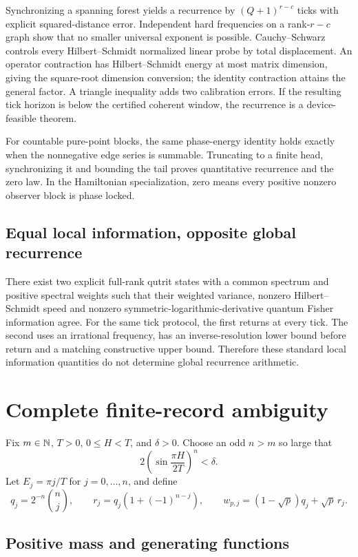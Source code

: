 Synchronizing a spanning forest yields a recurrence by
$(Q+1)^{r-c}$ ticks with explicit squared-distance error.  Independent hard
frequencies on a rank-$r-c$ graph show that no smaller universal exponent is
possible.  Cauchy--Schwarz controls every Hilbert--Schmidt normalized linear
probe by total displacement.  An operator contraction has Hilbert--Schmidt
energy at most matrix dimension, giving the square-root dimension conversion;
the identity contraction attains the general factor.  A triangle inequality
adds two calibration errors.  If the resulting tick horizon is below the
certified coherent window, the recurrence is a device-feasible theorem.

For countable pure-point blocks, the same phase-energy identity holds exactly
when the nonnegative edge series is summable.  Truncating to a finite head,
synchronizing it and bounding the tail proves quantitative recurrence and the
zero law.  In the Hamiltonian specialization, zero means every positive
nonzero observer block is phase locked.

\subsection{Equal local information, opposite global recurrence}

There exist two explicit full-rank qutrit states with a common spectrum and
positive spectral weights such that their weighted variance, nonzero
Hilbert--Schmidt speed and nonzero symmetric-logarithmic-derivative quantum
Fisher information agree.  For the same tick protocol, the first returns at
every tick.  The second uses an irrational frequency, has an
inverse-resolution lower bound before return and a matching constructive
upper bound.  Therefore these standard local information quantities do not
determine global recurrence arithmetic.

\section{Complete finite-record ambiguity}

Fix $m\in\mathbb N$, $T>0$, $0\le H<T$, and $\delta>0$.  Choose an odd
$n>m$ so large that
\[
 2\left(\sin\frac{\pi H}{2T}\right)^n<\delta.
\]
Let $E_j=\pi j/T$ for $j=0,\ldots,n$, and define
\[
 q_j=2^{-n}\binom{n}{j},\qquad
 r_j=q_j(1+(-1)^{n-j}),\qquad
 w_{p,j}=(1-\sqrt p)q_j+\sqrt p\,r_j.
\]

\subsection{Positive mass and generating functions}

